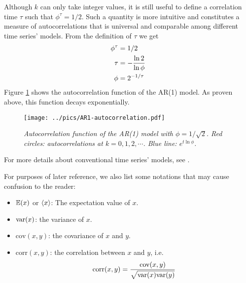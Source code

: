\documentclass{report}
\begin{document}
\begin{itemize}
  Although $k$ can only take integer values, it is still useful to
  define a correlation time $\tau$ such that $\phi^\tau = 1/2$. Such a
  quantity is more intuitive and constitutes a measure of
  autocorrelations that is universal and comparable among different
  time series' models. From the definition of $\tau$ we get
  \begin{equation}
    \label{eq:tau_def}
    \begin{aligned}
      \phi^\tau &= 1/2 \\
      \tau &= -{\ln 2 \over \ln\phi} \\
      \phi &= 2^{-1/\tau}
    \end{aligned}
  \end{equation}
  Figure \ref{fig:AR1-autocorrelation} shows the autocorrelation
  function of the AR(1) model. As proven above, this function decays
  exponentially.
  \begin{figure}[htb!]
    \centering
    \texttt{[image: ../pics/AR1-autocorrelation.pdf]}
    \caption{\small \it Autocorrelation function of the AR(1) model
      with $\phi=1/\sqrt{2}$. Red circles: autocorrelations at $k=0, 1,
      2, \cdots$. Blue line: $e^{t\ln\phi}$.}
    \label{fig:AR1-autocorrelation}
  \end{figure}
  For more details about conventional time series' models, see
  \cite{BoxJenkins94}.
\end{itemize}

For purposes of later reference, we also list some notations that may
cause confusion to the reader:
\begin{itemize}
\item $\mathbb{E}(x)$ or $\langle x\rangle$: The expectation value of $x$.
\item $\text{var}(x)$: the variance of $x$.
\item $\text{cov}(x,y)$: the covariance of $x$ and $y$.
\item $\text{corr}(x,y)$: the correlation between $x$ and $y$, i.e.
  \begin{equation*}
    \text{corr}(x,y) = {\text{cov}(x,y) \over \sqrt{\text{var}(x)\text{var}(y)}}
  \end{equation*}
\end{itemize}
\end{document}
